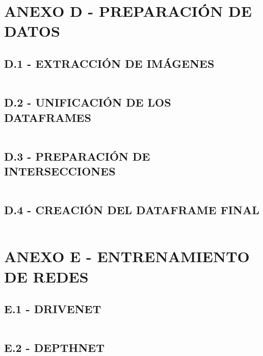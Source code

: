 \section*{ANEXO D - PREPARACIÓN DE DATOS}
\subsection*{D.1 - EXTRACCIÓN DE IMÁGENES}
	\inputminted[frame=lines,
	baselinestretch=1,
	fontsize=\footnotesize,
	autogobble]{python}{codigos/apendices/extraccion.py}
\subsection*{D.2 - UNIFICACIÓN DE LOS DATAFRAMES}
	\inputminted[frame=lines,
	baselinestretch=1,
	fontsize=\footnotesize,
	autogobble]{python}{codigos/apendices/unificar_df.py}
\subsection*{D.3 - PREPARACIÓN DE INTERSECCIONES}
	\inputminted[frame=lines,
	baselinestretch=1,
	fontsize=\footnotesize,
	autogobble]{python}{codigos/apendices/juncs.py}
\subsection*{D.4 - CREACIÓN DEL DATAFRAME FINAL}
	\inputminted[frame=lines,
	baselinestretch=1,
	fontsize=\footnotesize,
	autogobble]{python}{codigos/apendices/unificar_df_junc.py}
\section*{ANEXO E - ENTRENAMIENTO DE REDES}
\subsection*{E.1 - DRIVENET}
	\inputminted[frame=lines,
	baselinestretch=1,
	fontsize=\footnotesize,
	autogobble]{python}{codigos/apendices/drive_train.py}
\subsection*{E.2 - DEPTHNET}
	\inputminted[frame=lines,
	baselinestretch=1,
	fontsize=\footnotesize,
	autogobble]{python}{codigos/apendices/depth_train.py}
